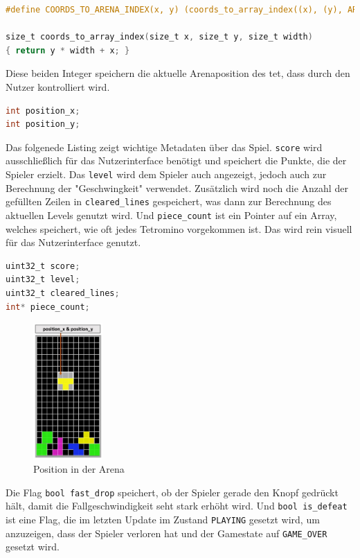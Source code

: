 \documentclass[11pt]{article}
\newcommand{\lstin}[1]{\lstinline[language=C]{#1}}
\begin{document}
\begin{lstlisting}[language=C]
#define COORDS_TO_ARENA_INDEX(x, y) (coords_to_array_index((x), (y), ARENA_WIDTH))

size_t coords_to_array_index(size_t x, size_t y, size_t width)
{ return y * width + x; }
\end{lstlisting}

Diese beiden Integer speichern die aktuelle Arenaposition des \gls{tet}, dass durch den Nutzer kontrolliert wird.
\begin{lstlisting}[language=C]
int position_x;
int position_y;
\end{lstlisting}

Das folgenede Listing zeigt wichtige Metadaten über das Spiel. \lstin{score} wird ausschließlich für das Nutzerinterface benötigt und speichert die Punkte, die der Spieler erzielt.
Das \lstin{level} wird dem Spieler auch angezeigt, jedoch auch zur Berechnung der "Geschwingkeit" verwendet. 
Zusätzlich wird noch die Anzahl der gefüllten Zeilen in \lstin{cleared_lines} gespeichert, was dann zur Berechnung des aktuellen Levels genutzt wird.
Und \lstin{piece_count} ist ein Pointer auf ein Array, welches speichert, wie oft jedes Tetromino vorgekommen ist. Das wird rein visuell für das Nutzerinterface genutzt.

\begin{lstlisting}[language=C]
uint32_t score;
uint32_t level;
uint32_t cleared_lines;
int* piece_count;
\end{lstlisting}

\begin{figure}
  \includegraphics[width=100px]{../images/position.jpg}
  \caption{Position in der Arena}
\end{figure}

Die Flag \lstin{bool fast_drop} speichert, ob der Spieler gerade den Knopf gedrückt hält, damit die Fallgeschwindigkeit seht stark erhöht wird.
Und \lstin{bool is_defeat} ist eine Flag, die im letzten Update im Zustand \lstin{PLAYING} gesetzt wird, um anzuzeigen, dass der Spieler verloren hat und der Gamestate auf \lstin{GAME_OVER} gesetzt wird.
\end{document}
